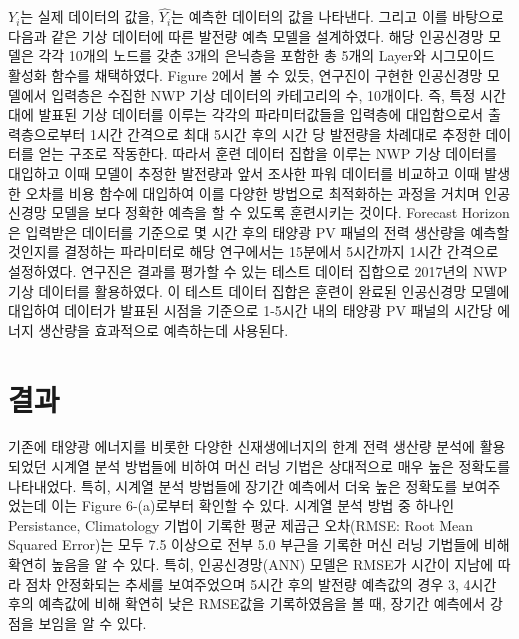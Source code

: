 \documentclass{article}
\begin{document}
$Y_i$는 실제 데이터의 값을, $\hat{Y_i}$는 예측한 데이터의 값을 나타낸다.
그리고 이를 바탕으로 다음과 같은 기상 데이터에 따른 발전량 예측 모델을 설계하였다. 해당 인공신경망 모델은 각각 10개의 노드를 갖춘 3개의 은닉층을 포함한 총 5개의 Layer와 시그모이드 활성화 함수를 채택하였다. Figure 2에서 볼 수 있듯, 연구진이 구현한 인공신경망 모델에서 입력층은 수집한 NWP 기상 데이터의 카테고리의 수, 10개이다. 즉, 특정 시간대에 발표된 기상 데이터를 이루는 각각의 파라미터값들을 입력층에 대입함으로서 출력층으로부터 1시간 간격으로 최대 5시간 후의 시간 당 발전량을 차례대로 추정한 데이터를 얻는 구조로 작동한다. 따라서 훈련 데이터 집합을 이루는 NWP 기상 데이터를 대입하고 이때 모델이 추정한 발전량과 앞서 조사한 파워 데이터를 비교하고 이때 발생한 오차를 비용 함수에 대입하여 이를 다양한 방법으로 최적화하는 과정을 거치며 인공신경망 모델을 보다 정확한 예측을 할 수 있도록 훈련시키는 것이다. Forecast Horizon은 입력받은 데이터를 기준으로 몇 시간 후의 태양광 PV 패널의 전력 생산량을 예측할 것인지를 결정하는 파라미터로 해당 연구에서는 15분에서 5시간까지 1시간 간격으로 설정하였다. 연구진은 결과를 평가할 수 있는 테스트 데이터 집합으로 2017년의 NWP 기상 데이터를 활용하였다. 이 테스트 데이터 집합은 훈련이 완료된 인공신경망 모델에 대입하여 데이터가 발표된 시점을 기준으로 1-5시간 내의 태양광 PV 패널의 시간당 에너지 생산량을 효과적으로 예측하는데 사용된다.



\section{결과}
기존에 태양광 에너지를 비롯한 다양한 신재생에너지의 한계 전력 생산량 분석에 활용되었던 시계열 분석 방법들에 비하여 머신 러닝 기법은 상대적으로 매우 높은 정확도를 나타내었다. 특히, 시계열 분석 방법들에 장기간 예측에서 더욱 높은 정확도를 보여주었는데 이는 Figure 6-(a)로부터 확인할 수 있다. 시계열 분석 방법 중 하나인 Persistance, Climatology 기법이 기록한 평균 제곱근 오차(RMSE: Root Mean Squared Error)는 모두 7.5 이상으로 전부 5.0 부근을 기록한 머신 러닝 기법들에 비해 확연히 높음을 알 수 있다. 특히, 인공신경망(ANN) 모델은 RMSE가 시간이 지남에 따라 점차 안정화되는 추세를 보여주었으며 5시간 후의 발전량 예측값의 경우 3, 4시간 후의 예측값에 비해 확연히 낮은 RMSE값을 기록하였음을 볼 때, 장기간 예측에서 강점을 보임을 알 수 있다.
\end{document}
